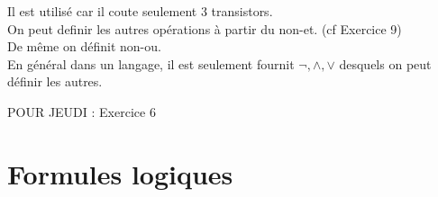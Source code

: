 Il est utilisé car il coute seulement 3 transistors. \\
On peut definir les autres opérations à partir du non-et. (cf Exercice 9) \\

De même on définit non-ou.\\

En général dans un langage, il est seulement fournit $\lnot,\land,\lor$ desquels on peut définir les autres.

POUR JEUDI : Exercice 6

\section{Formules logiques}













